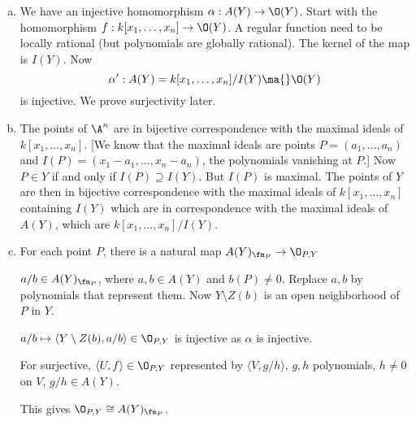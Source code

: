 \pf \hfill
\begin{enumerate}[(a)]
\item We have an injective homomorphism $\alpha: A(Y) \to \O(Y)$. Start with the homomorphism $f: k[x_1,\ldots,x_n] \to \O(Y)$. A regular function need to be locally rational (but polynomials are globally rational). The kernel of the map is $I(Y)$. Now
	\[
	\alpha': A(Y)= k[x_1,\ldots,x_n]/I(Y) \ma{} \O(Y)
	\]
is injective. We prove surjectivity later. 


\item The points of $\A^n$ are in bijective correspondence with the maximal ideals of $k[x_1,\ldots,x_n]$. [We know that the maximal ideals are points $P=(a_1,\ldots,a_n)$ and $I(P)= (x_1-a_1,\ldots,x_n-a_n)$, the polynomials vanishing at $P$.] Now $P \in Y$ if and only if $I(P) \supseteq I(Y)$. But $I(P)$ is maximal. The points of $Y$ are then in bijective correspondence with the maximal ideals of $k[x_1,\ldots,x_n]$ containing $I(Y)$ which are in correspondence with the maximal ideals of $A(Y)$, which are $k[x_1,\ldots,x_n]/I(Y)$. 

\item For each point $P$, there is a natural map $A(Y)_{\fm_P} \to \O_{P,Y}$

$a/b \in A(Y)_{\fm_P}$, where $a,b \in A(Y)$ and $b(P) \neq 0$. Replace $a,b$ by polynomials that represent them. Now $Y \setminus Z(b)$ is an open neighborhood of $P$ in $Y$.

$a/b \mapsto \langle Y \setminus Z(b), a/b \rangle \in \O_{P,Y}$ is injective as $\alpha$ is injective.

For surjective, $\langle U,f \rangle \in \O_{P,Y}$
represented by $\langle V, g/h \rangle$, $g,h$ polynomials, $h \neq 0$ on $V$, $g/h \in A(Y)$. 

This gives $\O_{P,Y} \cong A(Y)_{\fm_P}$. 
\end{enumerate}



























